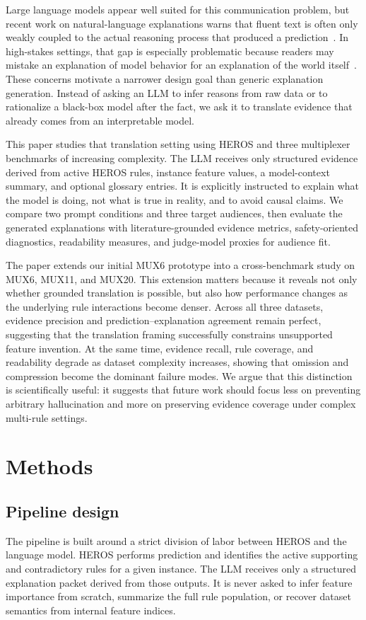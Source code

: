 \documentclass[sigconf,nonacm]{acmart}
\begin{document}
Large language models appear well suited for this communication problem, but recent work on natural-language explanations warns that fluent text is often only weakly coupled to the actual reasoning process that produced a prediction~\cite{atanasova2023faithfulness,madsen2024self,parcalabescu2024measuring,lyu2024survey}. In high-stakes settings, that gap is especially problematic because readers may mistake an explanation of model behavior for an explanation of the world itself~\cite{carriero2025describe}. These concerns motivate a narrower design goal than generic explanation generation. Instead of asking an LLM to infer reasons from raw data or to rationalize a black-box model after the fact, we ask it to translate evidence that already comes from an interpretable model.

This paper studies that translation setting using HEROS and three multiplexer benchmarks of increasing complexity. The LLM receives only structured evidence derived from active HEROS rules, instance feature values, a model-context summary, and optional glossary entries. It is explicitly instructed to explain what the model is doing, not what is true in reality, and to avoid causal claims. We compare two prompt conditions and three target audiences, then evaluate the generated explanations with literature-grounded evidence metrics, safety-oriented diagnostics, readability measures, and judge-model proxies for audience fit.

The paper extends our initial MUX6 prototype into a cross-benchmark study on MUX6, MUX11, and MUX20. This extension matters because it reveals not only whether grounded translation is possible, but also how performance changes as the underlying rule interactions become denser. Across all three datasets, evidence precision and prediction--explanation agreement remain perfect, suggesting that the translation framing successfully constrains unsupported feature invention. At the same time, evidence recall, rule coverage, and readability degrade as dataset complexity increases, showing that omission and compression become the dominant failure modes. We argue that this distinction is scientifically useful: it suggests that future work should focus less on preventing arbitrary hallucination and more on preserving evidence coverage under complex multi-rule settings.

\section{Methods}
\subsection{Pipeline design}
The pipeline is built around a strict division of labor between HEROS and the language model. HEROS performs prediction and identifies the active supporting and contradictory rules for a given instance. The LLM receives only a structured explanation packet derived from those outputs. It is never asked to infer feature importance from scratch, summarize the full rule population, or recover dataset semantics from internal feature indices.
\end{document}
